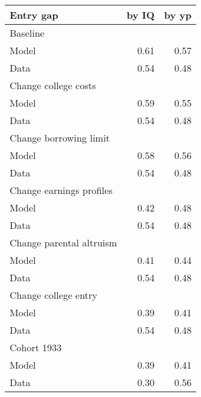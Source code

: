 \begin{tabular}{lrr}
\hline
Entry gap & by IQ  & by yp  \\ 
\hline
Baseline &   &   \\ 
Model & 0.61  & 0.57  \\ 
Data & 0.54  & 0.48  \\ 
Change college costs &   &   \\ 
Model & 0.59  & 0.55  \\ 
Data & 0.54  & 0.48  \\ 
Change borrowing limit &   &   \\ 
Model & 0.58  & 0.56  \\ 
Data & 0.54  & 0.48  \\ 
Change earnings profiles &   &   \\ 
Model & 0.42  & 0.48  \\ 
Data & 0.54  & 0.48  \\ 
Change parental altruism &   &   \\ 
Model & 0.41  & 0.44  \\ 
Data & 0.54  & 0.48  \\ 
Change college entry &   &   \\ 
Model & 0.39  & 0.41  \\ 
Data & 0.54  & 0.48  \\ 
Cohort 1933 &   &   \\ 
Model & 0.39  & 0.41  \\ 
Data & 0.30  & 0.56  \\ 
\hline
\end{tabular}%
